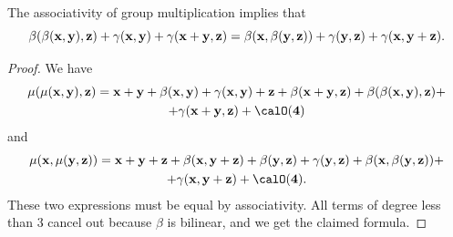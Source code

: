 \begin{lem}\label{3975}
    The associativity of group multiplication implies that
    \[
        \beta(\beta(\bf{x},\bf{y}),\bf{z})+\gamma(\bf{x},\bf{y})+\gamma(\bf{x}+\bf{y},\bf{z})
        =\beta(\bf{x},\beta(\bf{y},\bf{z}))+\gamma(\bf{y},\bf{z})+\gamma(\bf{x},\bf{y}+\bf{z}).
    \]
\end{lem}
\begin{proof}
    We have 
    \begin{multline}
        \mu(\mu(\bf{x},\bf{y}),\bf{z})=\bf{x}+\bf{y}+\beta(\bf{x},\bf{y})+\gamma(\bf{x},\bf{y})
        +\bf{z}+\beta(\bf{x}+\bf{y},\bf{z})+\beta(\beta(\bf{x},\bf{y}),\bf{z})+\\+\gamma(\bf{x}+\bf{y},\bf{z})+\calO(4)
    \end{multline}
    and 
    \begin{multline}
        \mu(\bf{x},\mu(\bf{y},\bf{z}))=\bf{x}+\bf{y}+\bf{z}+\beta(\bf{x},\bf{y}+\bf{z})+\beta(\bf{y},\bf{z})
        +\gamma(\bf{y},\bf{z})+\beta(\bf{x},\beta(\bf{y},\bf{z}))+\\+\gamma(\bf{x},\bf{y}+\bf{z})+\calO(4).
    \end{multline}
    These two expressions must be equal by associativity. All terms of degree less than 3 cancel out because $\beta$ is bilinear, and we get the claimed formula.
\end{proof}

